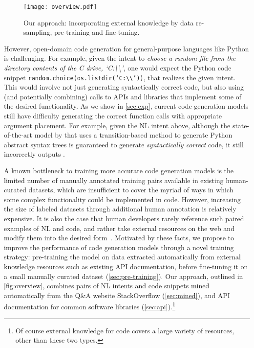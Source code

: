 \documentclass[11pt,a4paper]{article}
\newcommand*\ttvar[1]{\texttt{\expandafter\dottvar\detokenize{#1}\relax}}
\newcommand*\dottvar[1]{\ifx\relax#1\else
  \expandafter\ifx\string(#1\string(\allowbreak\else#1\fi
  \expandafter\dottvar\fi}
\begin{document}
\begin{figure}[t]
    \centering
    \texttt{[image: overview.pdf]}
    \vspace{-1mm}
    \caption{Our approach: incorporating external knowledge by data re-sampling, pre-training and fine-tuning.}
    \vspace{-2mm}
    \label{fig:overview}
\end{figure}

However, open-domain code generation for general-purpose languages 
like Python is challenging.
For example, given the intent to \textit{choose a random file from the 
directory contents of the C drive, `C:\textbackslash\textbackslash'}, 
one would expect the Python code snippet 
{\small\texttt{random.choice(os.listdir(`C:\textbackslash\textbackslash'))}}, 
that realizes the given intent.
This would involve not just generating syntactically correct code, but 
also using (and potentially combining) calls to APIs and libraries that 
implement some of the desired functionality.
As we show in \autoref{sec:exp}, current code generation models 
still have difficulty generating the correct function calls with 
appropriate argument placement.
For example, given the NL intent above, although the state-of-the-art model by 
\citet{yin-neubig-2018-tranx} that uses a transition-based method to generate Python abstract syntax trees is guaranteed to generate \textit{syntactically correct} code, it still incorrectly outputs 
{\small\ttvar{random.savefig(random(compile(open(`C:\\'))+100).isoformat())}}.

A known bottleneck to training more accurate code generation models is 
the limited number of manually annotated training pairs available in 
existing human-curated datasets, which are insufficient to cover the myriad of ways in which some complex functionality could be implemented in code.
However, increasing the size of labeled datasets through additional human
annotation is relatively expensive.
It is also the case that human developers rarely reference such paired examples
of NL and code, and rather take external resources on the web and modify them into the desired form~\cite{brandt2009two,brandt2010example,gu2016deep}.
Motivated by these facts, we propose to improve the performance of code 
generation models through a novel training strategy:
pre-training the model on data extracted automatically from external 
knowledge resources such as existing API documentation, 
before fine-tuning it on
a small manually curated dataset (\autoref{sec:pre-training}).
Our approach, outlined in \autoref{fig:overview}, combines pairs of NL intents and code snippets mined 
automatically from the Q\&A website StackOverflow (\autoref{sec:mined}), 
and API documentation for common software libraries (\autoref{sec:api}).\footnote{
Of course external knowledge for code covers a large variety of resources, other than these two types.}
\end{document}
